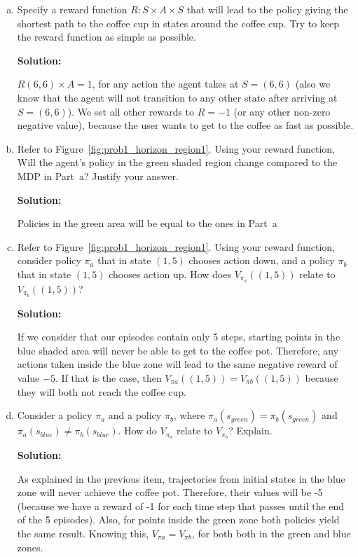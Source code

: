 \documentclass[12pt]{article}
\begin{document}
\begin{enumerate}[a)]
\item Specify a reward function $R : S \times A \times S$ that will lead to the
  policy giving the shortest path to the coffee cup in states around
  the coffee cup. Try to keep the reward function as simple as possible.

  \textbf{Solution:}

$R (6,6) \times A =1$, for any action the agent takes at $S=(6,6)$ (also we know that the agent will not transition to any other state after arriving at  $S=(6,6)$). We set all other rewards to $R=-1$ (or any other non-zero negative value), because the user wants to get to the coffee as fast as possible.

\item Refer to Figure~\ref{fig:prob1_horizon_region1}. Using your
  reward function, Will the agent's policy in the green shaded region
  change compared to the MDP in Part~a? Justify your answer.

  \textbf{Solution:}

Policies in the green area will be equal to the ones in Part~a

\item Refer to Figure~\ref{fig:prob1_horizon_region1}. Using your
  reward function, consider policy $\pi_a$ that in state $(1,5)$
  chooses action down, and a policy $\pi_b$ that in state
  $(1,5)$ chooses action up. How does $V_{\pi_a} ((1, 5))$ relate to
  $V_{\pi_b}((1,5))$?

  \textbf{Solution:}

If we consider that our episodes contain only 5 steps, starting points in the blue shaded area will never be able to get to the coffee pot. Therefore, any actions taken inside the blue zone will lead to the same negative reward of value $-5$. If that is the case, then $V_{\pi a}((1,5))=V_{\pi b}((1,5))$ because they will both not reach the coffee cup.

\item Consider a policy $\pi_a$ and a policy $\pi_b$, where
  $\pi_a(s_{green}) = \pi_b(s_{green})$ and
  $\pi_a(s_{blue}) \not= \pi_b(s_{blue})$. How do $V_{\pi_a}$ relate
  to $V_{\pi_b}$? Explain.

  \textbf{Solution:}

  As explained in the previous item, trajectories from initial states in the blue zone will never achieve the coffee pot. Therefore, their values will be -5 (because we have a reward of -1 for each time step that passes until the end of the 5 episodes). Also, for points inside the green zone both policies yield the same result. Knowing this, $V_{\pi a}=V_{\pi b}$, for both both in the green and blue zones.

\end{enumerate}
\end{document}
